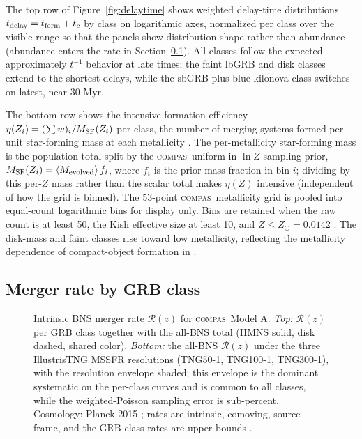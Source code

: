 \documentclass[twocolumn,amsmath]{aastex702}
\newcommand{\compas}{\textsc{compas}}
\newcommand{\Rz}{\mathcal{R}(z)}
\newcommand{\Zsun}{Z_\odot}
\begin{document}
The top row of Figure~\ref{fig:delaytime} shows weighted delay-time
distributions $t_{\rm delay} = t_{\rm form} + t_c$ by class on logarithmic axes,
normalized per class over the visible range so that the panels show distribution
shape rather than abundance (abundance enters the rate in
Section~\ref{sec:classrates}). All classes follow the expected approximately
$t^{-1}$ behavior at late times; the faint lbGRB and disk classes extend to the
shortest delays, while the sbGRB plus blue kilonova class switches on latest,
near 30 Myr.

The bottom row shows the intensive formation efficiency
$\eta(Z_i) = (\sum w)_i / M_{\rm SF}(Z_i)$ per class, the number of merging systems
formed per unit star-forming mass at each metallicity \citep[their Fig.~5]{broekgaarden2021}.
The per-metallicity star-forming mass is the population total split by the \compas\
uniform-in-$\ln Z$ sampling prior, $M_{\rm SF}(Z_i) = \langle M_{\rm evolved}\rangle\,f_i$,
where $f_i$ is the prior mass fraction in bin $i$; dividing by this per-$Z$ mass rather than
the scalar total makes $\eta(Z)$ intensive (independent of how the grid is binned). The
53-point \compas\ metallicity grid is pooled into equal-count logarithmic bins for display
only. Bins are retained when the raw count is at least 50, the Kish effective size at least
10, and $Z \leq \Zsun = 0.0142$ \citep{asplund2009}. The disk-mass and faint
classes rise toward low metallicity, reflecting the metallicity dependence of
compact-object formation in \citet{broekgaarden2021}.

\subsection{Merger rate by GRB class} \label{sec:classrates}

\begin{figure}[tbp]
\par\medskip
{}
\caption{Intrinsic BNS merger rate $\Rz$ for \compas\ Model A. \textit{Top:}
$\Rz$ per \citet{gottlieb2024} GRB class together with the all-BNS total (HMNS
solid, disk dashed, shared color). \textit{Bottom:} the all-BNS $\Rz$ under the
three \citet{levina2026} IllustrisTNG MSSFR resolutions (TNG50-1, TNG100-1,
TNG300-1), with the resolution envelope shaded; this envelope is the dominant
systematic on the per-class curves and is common to all classes, while the
weighted-Poisson sampling error is sub-percent. Cosmology: Planck 2015
\citep{planck2016}; rates are intrinsic, comoving, source-frame, and the
GRB-class rates are upper bounds \citep{gottlieb2023}. \label{fig:rateclass}}
\end{figure}
\end{document}
